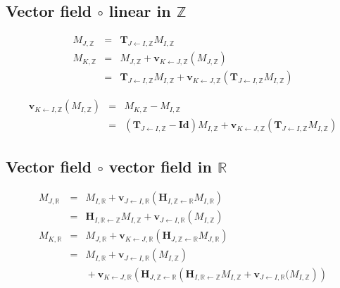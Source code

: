 \subsection{Vector field $\circ$ linear in $\mathbb{Z}$ }

\begin{eqnarray*}
M_{J, \mathbb{Z}} &  =  &
\mathbf{T}_{J \leftarrow I, \mathbb{Z}} M_{I, \mathbb{Z}} \\
M_{K, \mathbb{Z}} & = &
M_{J, \mathbb{Z}} 
+ \mathbf{v}_{K \leftarrow J, \mathbb{Z}}(M_{J, \mathbb{Z}}) \\
& = &
\mathbf{T}_{J \leftarrow I, \mathbb{Z}} M_{I, \mathbb{Z}} 
+ \mathbf{v}_{K \leftarrow J, \mathbb{Z}}(\mathbf{T}_{J \leftarrow I, \mathbb{Z}} M_{I, \mathbb{Z}} )
\end{eqnarray*}

\begin{eqnarray*}
\mathbf{v}_{K \leftarrow I, \mathbb{Z}}(M_{I, \mathbb{Z}})
& = &
M_{K, \mathbb{Z}} - M_{I, \mathbb{Z}} \\
& = &
\left( \mathbf{T}_{J \leftarrow I, \mathbb{Z}} - \mathbf{Id} \right)
M_{I, \mathbb{Z}}
+ \mathbf{v}_{K \leftarrow J, \mathbb{Z}}
( \mathbf{T}_{J \leftarrow I, \mathbb{Z}} M_{I, \mathbb{Z}} )
\end{eqnarray*}


\subsection{Vector field $\circ$ vector field in $\mathbb{R}$ }

\begin{eqnarray*}
M_{J, \mathbb{R}} & =  &
M_{I, \mathbb{R}} 
+ \mathbf{v}_{J \leftarrow I, \mathbb{R}}(\mathbf{H}_{I, \mathbb{Z} \leftarrow \mathbb{R}}  M_{I, \mathbb{R}}) \\
& = &
\mathbf{H}_{I, \mathbb{R} \leftarrow \mathbb{Z}} M_{I, \mathbb{Z}}
+ \mathbf{v}_{J \leftarrow I, \mathbb{R}}(M_{I, \mathbb{Z}}) \\
M_{K, \mathbb{R}} & = &
M_{J, \mathbb{R}} 
+ \mathbf{v}_{K \leftarrow J, \mathbb{R}}(\mathbf{H}_{J, \mathbb{Z} \leftarrow \mathbb{R}}  M_{J, \mathbb{R}}) \\
& = &
M_{I, \mathbb{R}}
+ \mathbf{v}_{J \leftarrow I, \mathbb{R}}(M_{I, \mathbb{Z}}) \\
& & {}
+ \mathbf{v}_{K\leftarrow J, \mathbb{R}}\left(
\mathbf{H}_{J, \mathbb{Z} \leftarrow \mathbb{R}} 
\left( 
\mathbf{H}_{I, \mathbb{R} \leftarrow \mathbb{Z}} M_{I, \mathbb{Z}}
+ 
\mathbf{v}_{J \leftarrow I, \mathbb{R}}(M_{I, \mathbb{Z}}
\right)
\right)
\end{eqnarray*}


